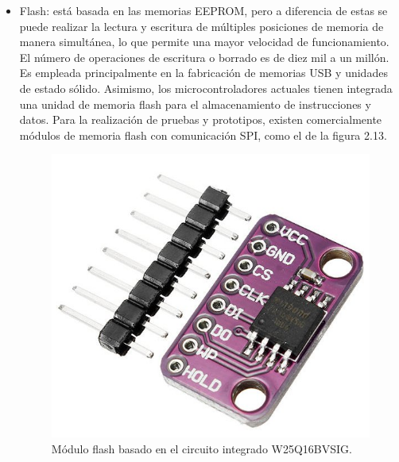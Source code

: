 \begin{itemize}

	\item Flash: está basada en las memorias EEPROM, pero a diferencia de estas se puede realizar la lectura y escritura de múltiples posiciones de memoria de manera simultánea, lo que permite una mayor velocidad de funcionamiento. El número de operaciones de escritura o borrado es de diez mil a un millón. Es empleada principalmente en la fabricación de memorias USB y unidades de estado sólido. Asimismo, los microcontroladores actuales tienen integrada una unidad de memoria flash para el almacenamiento de instrucciones y datos. Para la realización de pruebas y prototipos, existen comercialmente módulos de memoria flash con comunicación SPI, como el de la figura 2.13.
	\begin{figure}[h]
		\centering
		\includegraphics[scale=0.25]{./Figures/flash.jpg}
		\caption{Módulo flash basado en el circuito integrado W25Q16BVSIG\protect\footnotemark.}
		\label{fig:cuadradoAzul}
	\end{figure}

	
\end{itemize}


